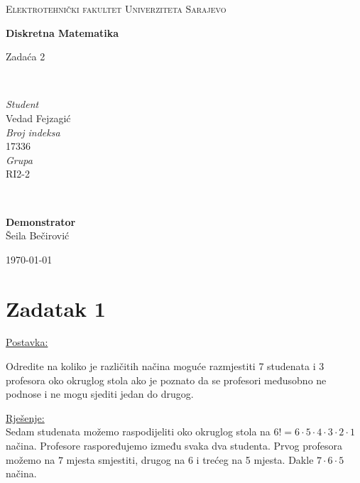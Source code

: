 \documentclass[12pt]{article}
\begin{document}
\begin{titlepage}
	\newcommand{\HRule}{\rule{\linewidth}{0.5mm}}
	
	\center
	
	\textsc{\Large Elektrotehnički fakultet Univerziteta Sarajevo}\\[4cm]
	
	{\huge\bfseries Diskretna Matematika\vspace{5mm}

 	Zadaća 2}\\[4.5cm]

	\begin{minipage}{0.4\textwidth}
		\begin{flushleft}
			\large
			\textit{Student}\\
			Vedad Fejzagić\\[5mm]
			\textit{Broj indeksa}\\
			17336\\[5mm]
			\textit{Grupa}\\
			RI2-2
		\end{flushleft}
	\end{minipage}
	~
	\begin{minipage}{0.4\textwidth}
		\begin{flushright}
			\large
			\textbf{Demonstrator}\\
			\hspace{10mm}Šeila Bečirović
		\end{flushright}
	\end{minipage}
	
	\vfill\vfill\vfill
	
	{\large\today}
	
	\vfill
	
\end{titlepage}


\newpage
\section*{Zadatak 1\label{Z1}}

\underline{Postavka:}

Odredite na koliko je različitih načina moguće razmjestiti 7 studenata i 3 profesora oko okruglog stola ako je poznato da se profesori međusobno ne podnose i ne mogu sjediti jedan do drugog.

\underline{Rješenje:}\\

Sedam studenata možemo raspodijeliti oko okruglog stola na $6! = 6  \cdot 5 \cdot 4 \cdot 3 \cdot 2 \cdot 1$ načina. Profesore raspoređujemo između svaka dva studenta. Prvog profesora možemo na $7$ mjesta smjestiti, drugog na 6 i trećeg na 5 mjesta. Dakle $7 \cdot 6 \cdot 5$ načina.
\end{document}
